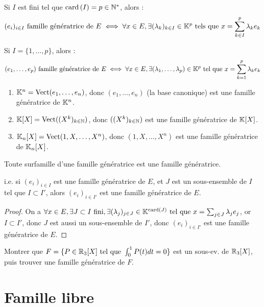 \documentclass[12pt, a4paper]{report}
\begin{document}
\begin{remark}
    Si $I$ est fini tel que $\mathrm{card}\left(I\right) = p \in \mathbb{N}^*$, alors :
    $$(e_i)_{i \in I} \text{ famille génératrice de } E \iff \forall x \in E, \exists (\lambda_k)_{k\in I} \in \mathbb{K}^p \text{ tels que } x = \sum_{k \in I}^p \lambda_k e_k$$

    Si $I = \{1,\dots,p\}$, alors :
    $$(e_1,\dots,e_p) \text{ famille génératrice de } E \iff \forall x \in E, \exists (\lambda_1,\dots,\lambda_p) \in \mathbb{K}^p \text{ tel que } x = \sum_{k=1}^p \lambda_k e_k$$
\end{remark}

\begin{example}
    \begin{enumerate}
        \item $\mathbb{K}^n = \mathrm{Vect}(e_1,\dots,e_n)$, donc $(e_1,\dots,e_n)$ (la base canonique) est une famille génératrice de $\mathbb{K}^n$.
        \item $\mathbb{K}[X] = \mathrm{Vect}((X^k)_{k \in \mathbb{N}})$, donc $((X^k)_{k \in \mathbb{N}})$ est une famille génératrice de $\mathbb{K}[X]$.
        \item $\mathbb{K}_n[X] = \mathrm{Vect}(1,X,\dots,X^n)$, donc $(1,X,\dots,X^n)$ est une famille génératrice de $\mathbb{K}_n[X]$.
    \end{enumerate}
\end{example}

\begin{property}
    Toute surfamille d'une famille génératrice est une famille génératrice.
    
    i.e. si $(e_i)_{i \in I}$ est une famille génératrice de $E$, et $J$ est un sous-ensemble de $I$ tel que $I \subset I'$, alors $(e_i)_{i \in I'}$ est une famille génératrice de $E$.
\end{property}

\begin{proof}
    On a $\forall x \in E, \exists J \subset I \text{ fini}, \exists (\lambda_j)_{j \in J} \in \mathbb{K}^{\mathrm{card}\left(J\right)} \text{ tel que } x = \sum_{j \in J} \lambda_j e_j$, or $I \subset I'$, donc $J$ est aussi un sous-ensemble de $I'$, donc $(e_i)_{i \in I'}$ est une famille génératrice de $E$.
\end{proof}

\begin{exercise}
    Montrer que $F = \{ P \in \mathbb{R}_3[X] \text{ tel que } \int_{0}^{1} P(t) dt = 0\}$ est un sous-ev. de $\mathbb{R}_3[X]$, puis trouver une famille génératrice de $F$.
\end{exercise}

\section{Famille libre}
\end{document}
